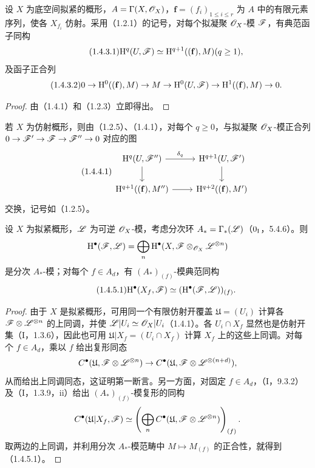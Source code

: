 设 $X$ 为底空间拟紧的概形，$A=\Gamma(X,\mathscr O_X)$，$\mathbf f=(f_i)_{1\leq i\leq r}$ 为 $A$ 中的有限元素序列，使各 $X_{f_i}$ 仿射。采用（1.2.1）的记号，对每个拟凝聚 $\mathscr O_X$-模 $\mathscr F$，有典范函子同构
\begin{equation}\tag{1.4.3.1}
\mathrm H^q(U,\mathscr F)\simeq\mathrm H^{q+1}((\mathbf f),M)(q\geq1),
\end{equation}
及函子正合列
\begin{equation}\tag{1.4.3.2}
0\to\mathrm H^0((\mathbf f),M)\to M\to\mathrm H^0(U,\mathscr F)
\to\mathrm H^1((\mathbf f),M)\to0.
\end{equation}
\begin{proof}由（1.4.1）和（1.2.3）立即得出。\end{proof}

若 $X$ 为仿射概形，则由（1.2.5）、（1.4.1），对每个 $q\geq0$，与拟凝聚 $\mathscr O_X$-模正合列 $0\to\mathscr F'\to\mathscr F\to\mathscr F''\to0$ 对应的图
\begin{equation}\tag{1.4.4.1}
\begin{tikzcd}
\mathrm H^q(U,\F'')\arrow[r,"\delta_q"]\arrow[d]&\mathrm H^{q+1}(U,\F')\arrow[d]\\
\mathrm H^{q+1}((\mathbf f),M'')\arrow[r]&\mathrm H^{q+2}((\mathbf f),M')
\end{tikzcd}
\end{equation}
交换，记号如（1.2.5）。

设 $X$ 为拟紧概形，$\mathscr L$ 为可逆 $\mathscr O_X$-模，考虑分次环 $A_*=\Gamma_*(\mathscr L)$（$0_{\mathrm I}$，5.4.6）。则
\[
\mathrm H^\bullet(\mathscr F,\mathscr L)=\bigoplus_n\mathrm H^\bullet(X,\mathscr F\otimes_{\mathscr O_X}\mathscr L^{\otimes n})
\]
是分次 $A_*$-模；对每个 $f\in A_d$，有 $(A_*)_{(f)}$-模典范同构
\begin{equation}\tag{1.4.5.1}
\mathrm H^\bullet(X_f,\mathscr F)\simeq(\mathrm H^\bullet(\mathscr F,\mathscr L))_{(f)}.
\end{equation}
\begin{proof}
由于 $X$ 是拟紧概形，可用同一个有限仿射开覆盖 $\mathfrak U=(U_i)$ 计算各 $\mathscr F\otimes\mathscr L^{\otimes n}$ 的上同调，并使 $\mathscr L|U_i\simeq\mathscr O_X|U_i$（1.4.1）。各 $U_i\cap X_f$ 显然也是仿射开集（I，1.3.6），因此也可用 $\mathfrak U|X_f=(U_i\cap X_f)$ 计算 $X_f$ 上的这些上同调。对每个 $f\in A_d$，乘以 $f$ 给出复形同态
\[
C^\bullet(\mathfrak U,\mathscr F\otimes\mathscr L^{\otimes n})\to
C^\bullet(\mathfrak U,\mathscr F\otimes\mathscr L^{\otimes(n+d)}),
\]
从而给出上同调同态，这证明第一断言。另一方面，对固定 $f\in A_d$，（I，9.3.2）及（I，1.3.9，ii）给出 $(A_*)_{(f)}$-模复形的同构
\[
C^\bullet(\mathfrak U|X_f,\mathscr F)
\simeq\left(\bigoplus_nC^\bullet(\mathfrak U,\mathscr F\otimes\mathscr L^{\otimes n})\right)_{(f)}.
\]
取两边的上同调，并利用分次 $A_*$-模范畴中 $M\mapsto M_{(f)}$ 的正合性，就得到（1.4.5.1）。
\end{proof}


